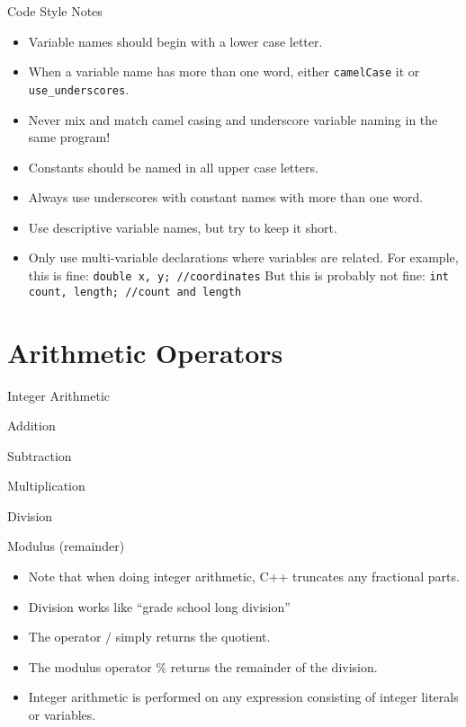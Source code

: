 \documentclass[]{beamer}
\begin{document}
\begin{frame}{Code Style Notes}
    \begin{itemize}[<+->]
        \item Variable names should begin with a lower case letter.
        \item When a variable name has more than one word, either 
            \texttt{camelCase} it or \texttt{use\_underscores}.
        \item Never mix and match camel casing and underscore variable
        naming in the same program!
        \item Constants should be named in all upper case letters.
        \item Always use underscores with constant names with more
            than one word.
        \item Use descriptive variable names, but try to keep it short.
        \item Only use multi-variable declarations where variables are
            related.  For example, this is fine:
            \newline\texttt{double x, y;        //coordinates}
            \newline But this is probably not fine:
            \newline\texttt{int count, length;  //count and length}
    \end{itemize}
\end{frame}

\section{Arithmetic Operators}

\begin{frame}{Integer Arithmetic}
    \begin{description}[<+->]
        \item[$+$] Addition
        \item[$-$] Subtraction
        \item[$*$] Multiplication
        \item[$/$] Division
        \item[$\%$] Modulus (remainder)
    \end{description}

    \begin{itemize}[<+->]
        \item Note that when doing integer arithmetic, C++ truncates
            any fractional parts.
        \item Division works like ``grade school long division''
        \item The operator $/$ simply returns the quotient.
        \item The modulus operator $\%$ returns the remainder of the
            division.
        \item Integer arithmetic is performed on any expression
            consisting of integer literals or variables.
    \end{itemize}
\end{frame}
\end{document}
